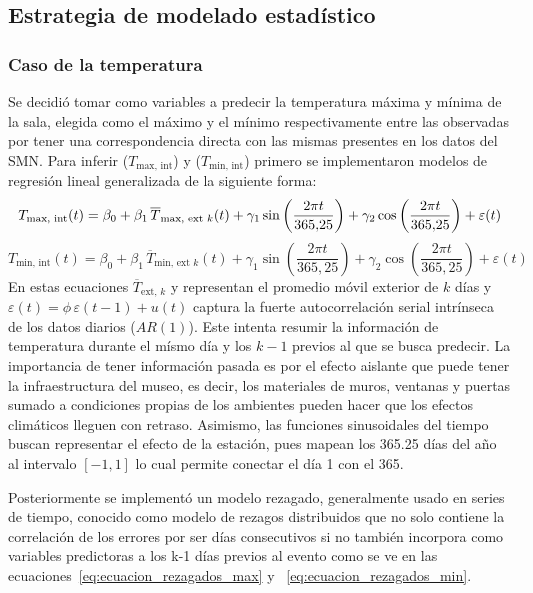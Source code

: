 \documentclass[11pt,a4paper]{article}
\begin{document}
\subsection{Estrategia de modelado estadístico}
\subsubsection{Caso de la temperatura}
Se decidió tomar como variables a predecir la temperatura máxima y mínima de la sala, elegida como el máximo y el mínimo respectivamente entre las observadas por tener una correspondencia directa con las mismas presentes en los datos del SMN. Para inferir ($T_{\text{max, int}}$) y ($T_{\text{min, int}}$) primero se implementaron modelos de regresión lineal generalizada de la siguiente forma:
\begin{equation}
    T_{\text{max, int}}(t) = \beta_0 + \beta_1 \, \overline{T}_{\text{max, ext } k}(t) + \gamma_1 \sin\left(\frac{2\pi t}{365{,}25}\right) + \gamma_2 \cos\left(\frac{2\pi t}{365{,}25}\right) + \varepsilon(t) 
    \\
\end{equation}
\begin{equation}
    T_{\text{min, int}}(t) = \beta_0 + \beta_1 \, \overline{T}_{\text{min, ext } k}(t) + \gamma_1 \sin\left(\frac{2\pi t}{365{,}25}\right) + \gamma_2 \cos\left(\frac{2\pi t}{365{,}25}\right) + \varepsilon(t)
\end{equation}
En estas ecuaciones $\overline{T}_{\text{ext, } k}$ y  representan el promedio móvil exterior de $k$ días y $\varepsilon(t) = \phi \, \varepsilon(t-1) + u(t)$ captura la fuerte autocorrelación serial intrínseca de los datos diarios ($AR(1)$). Este intenta resumir la información de temperatura durante el mísmo día y los $k-1$ previos al que se busca predecir. La importancia de tener información pasada es por el efecto aislante que puede tener la infraestructura del museo, es decir, los materiales de muros, ventanas y puertas sumado a condiciones propias de los ambientes pueden hacer que los efectos climáticos lleguen con retraso. Asimismo, las funciones sinusoidales del tiempo buscan representar el efecto de la estación, pues mapean los 365.25 días del año al intervalo $[-1,1]$ lo cual permite conectar el día 1 con el 365.

Posteriormente se implementó un modelo rezagado, generalmente usado en series de tiempo, conocido como modelo de rezagos distribuidos que no solo contiene la correlación de los errores por ser días consecutivos si no también incorpora como variables predictoras a los k-1 días previos al evento como se ve en las ecuaciones~\ref{eq:ecuacion_rezagados_max} y ~\ref{eq:ecuacion_rezagados_min}.
\end{document}
